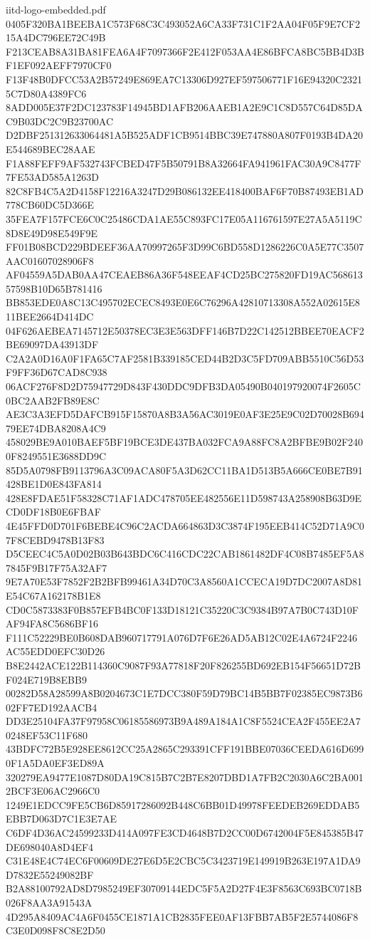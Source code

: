 \begin{filecontents*}[overwrite]{iitd-logo-embedded.pdf}
0405F320BA1BEEBA1C573F68C3C493052A6CA33F731C1F2AA04F05F9E7CF215A4DC796EE72C49B
F213CEAB8A31BA81FEA6A4F7097366F2E412F053AA4E86BFCA8BC5BB4D3BF1EF092AEFF7970CF0
F13F48B0DFCC53A2B57249E869EA7C13306D927EF597506771F16E94320C23215C7D80A4389FC6
8ADD005E37F2DC123783F14945BD1AFB206AAEB1A2E9C1C8D557C64D85DAC9B03DC2C9B23700AC
D2DBF251312633064481A5B525ADF1CB9514BBC39E747880A807F0193B4DA20E544689BEC28AAE
F1A88FEFF9AF532743FCBED47F5B50791B8A32664FA941961FAC30A9C8477F7FE53AD585A1263D
82C8FB4C5A2D4158F12216A3247D29B086132EE418400BAF6F70B87493EB1AD778CB60DC5D366E
35FEA7F157FCE6C0C25486CDA1AE55C893FC17E05A116761597E27A5A5119C8D8E49D98E549F9E
FF01B08BCD229BDEEF36AA70997265F3D99C6BD558D1286226C0A5E77C3507AAC01607028906F8
AF04559A5DAB0AA47CEAEB86A36F548EEAF4CD25BC275820FD19AC56861357598B10D65B781416
BB853EDE0A8C13C495702ECEC8493E0E6C76296A42810713308A552A02615E811BEE2664D414DC
04F626AEBEA7145712E50378EC3E3E563DFF146B7D22C142512BBEE70EACF2BE69097DA43913DF
C2A2A0D16A0F1FA65C7AF2581B339185CED44B2D3C5FD709ABB5510C56D53F9FF36D67CAD8C938
06ACF276F8D2D75947729D843F430DDC9DFB3DA05490B040197920074F2605C0BC2AAB2FB89E8C
AE3C3A3EFD5DAFCB915F15870A8B3A56AC3019E0AF3E25E9C02D70028B69479EE74DBA8208A4C9
458029BE9A010BAEF5BF19BCE3DE437BA032FCA9A88FC8A2BFBE9B02F2400F8249551E3688DD9C
85D5A0798FB9113796A3C09ACA80F5A3D62CC11BA1D513B5A666CE0BE7B91428BE1D0E843FA814
428E8FDAE51F58328C71AF1ADC478705EE482556E11D598743A258908B63D9ECD0DF18B0E6FBAF
4E45FFD0D701F6BEBE4C96C2ACDA664863D3C3874F195EEB414C52D71A9C07F8CEBD9478B13F83
D5CEEC4C5A0D02B03B643BDC6C416CDC22CAB1861482DF4C08B7485EF5A87845F9B17F75A32AF7
9E7A70E53F7852F2B2BFB99461A34D70C3A8560A1CCECA19D7DC2007A8D81E54C67A162178B1E8
CD0C5873383F0B857EFB4BC0F133D18121C35220C3C9384B97A7B0C743D10FAF94FA8C5686BF16
F111C52229BE0B608DAB960717791A076D7F6E26AD5AB12C02E4A6724F2246AC55EDD0EFC30D26
B8E2442ACE122B114360C9087F93A77818F20F826255BD692EB154F56651D72BF024E719B8EBB9
00282D58A28599A8B0204673C1E7DCC380F59D79BC14B5BB7F02385EC9873B602FF7ED192AACB4
DD3E25104FA37F97958C06185586973B9A489A184A1C8F5524CEA2F455EE2A70248EF53C11F680
43BDFC72B5E928EE8612CC25A2865C293391CFF191BBE07036CEEDA616D6990F1A5DA0EF3ED89A
320279EA9477E1087D80DA19C815B7C2B7E8207DBD1A7FB2C2030A6C2BA0012BCF3E06AC2966C0
1249E1EDCC9FE5CB6D85917286092B448C6BB01D49978FEEDEB269EDDAB5EBB7D063D7C1E3E7AE
C6DF4D36AC24599233D414A097FE3CD4648B7D2CC00D6742004F5E845385B47DE698040A8D4EF4
C31E48E4C74EC6F00609DE27E6D5E2CBC5C3423719E149919B263E197A1DA9D7832E55249082BF
B2A88100792AD8D7985249EF30709144EDC5F5A2D27F4E3F8563C693BC0718B026F8AA3A91543A
4D295A8409AC4A6F0455CE1871A1CB2835FEE0AF13FBB7AB5F2E5744086F8C3E0D098F8C8E2D50

\end{filecontents*}
